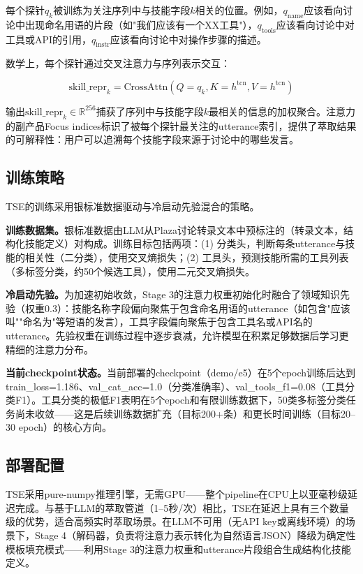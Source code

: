 \documentclass[conference]{IEEEtran}
\begin{document}
每个探针$q_k$被训练为关注序列中与技能字段$k$相关的位置。例如，$q_{\mathrm{name}}$应该看向讨论中出现命名用语的片段（如"我们应该有一个XX工具"），$q_{\mathrm{tools}}$应该看向讨论中对工具或API的引用，$q_{\mathrm{instr}}$应该看向讨论中对操作步骤的描述。

数学上，每个探针通过交叉注意力与序列表示交互：

\begin{equation}
\mathrm{skill\_repr}_k = \mathrm{CrossAttn}(Q=q_k, K=h^{\mathrm{tcn}}, V=h^{\mathrm{tcn}})
\label{eq:cross_attn}
\end{equation}

输出$\mathrm{skill\_repr}_k \in \mathbb{R}^{256}$捕获了序列中与技能字段$k$最相关的信息的加权聚合。注意力的副产品Focus indices标识了被每个探针最关注的utterance索引，提供了萃取结果的可解释性：用户可以追溯每个技能字段来源于讨论中的哪些发言。

\subsection{训练策略}

TSE的训练采用银标准数据驱动与冷启动先验混合的策略。

\textbf{训练数据集。}银标准数据由LLM从Plaza讨论转录文本中预标注的（转录文本，结构化技能定义）对构成。训练目标包括两项：(1) 分类头，判断每条utterance与技能的相关性（二分类），使用交叉熵损失；(2) 工具头，预测技能所需的工具列表（多标签分类，约50个候选工具），使用二元交叉熵损失。

\textbf{冷启动先验。}为加速初始收敛，Stage 3的注意力权重初始化时融合了领域知识先验（权重0.3）：技能名称字段偏向聚焦于包含命名用语的utterance（如包含"应该叫""命名为"等短语的发言），工具字段偏向聚焦于包含工具名或API名的utterance。先验权重在训练过程中逐步衰减，允许模型在积累足够数据后学习更精细的注意力分布。

\textbf{当前checkpoint状态。}当前部署的checkpoint（demo/e5）在5个epoch训练后达到train\_loss=1.186、val\_cat\_acc=1.0（分类准确率）、val\_tools\_f1=0.08（工具分类F1）。工具分类的极低F1表明在5个epoch和有限训练数据下，50类多标签分类任务尚未收敛——这是后续训练数据扩充（目标200+条）和更长时间训练（目标20--30 epoch）的核心方向。

\subsection{部署配置}

TSE采用pure-numpy推理引擎，无需GPU——整个pipeline在CPU上以亚毫秒级延迟完成。与基于LLM的萃取管道（1--5秒/次）相比，TSE在延迟上具有三个数量级的优势，适合高频实时萃取场景。在LLM不可用（无API key或离线环境）的场景下，Stage 4（解码器，负责将注意力表示转化为自然语言JSON）降级为确定性模板填充模式——利用Stage 3的注意力权重和utterance片段组合生成结构化技能定义。
\end{document}

